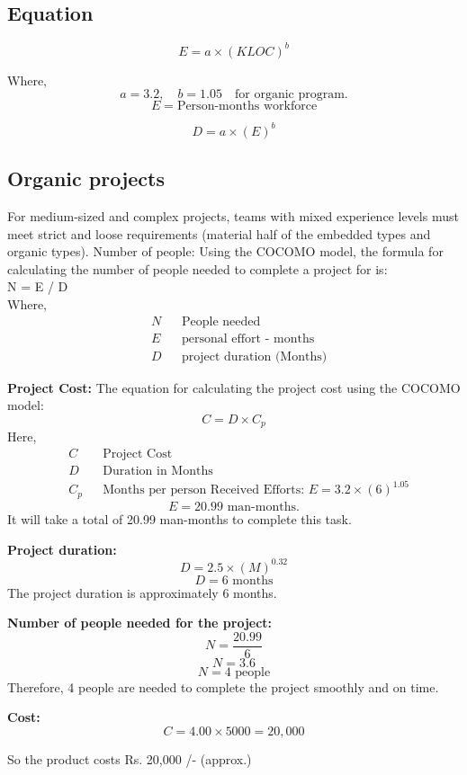 \documentclass[oneside,a4paper,12pt]{report}
\begin{document}
\subsection{Equation}
\[
E = a \times (KLOC)^b
\]

Where,
\[
a = 3.2, \quad b = 1.05 \quad \text{for organic program.}
\]
\[ E = \text{Person-months workforce} \]

\[
D = a \times (E)^b
\]

\subsection{Organic projects}
For medium-sized and complex projects, teams with mixed experience levels must meet strict and loose requirements (material half of the embedded types and organic types). Number of people: Using the COCOMO model, the formula for calculating the number of people needed to complete a project for is:\\
N = E / D\\
Where,
\begin{align*}
    &N & &\text{People needed}\\
    &E & &\text{personal effort - months}\\ 
    &D & &\text{project duration (Months)}
\end{align*}

\textbf{Project Cost:} The equation for calculating the project cost using the COCOMO model: 
\[ C = D \times C_p \]
Here, 
\begin{align*}
    &C & &\text{Project Cost}\\
    &D & &\text{Duration in Months}\\
    &C_p & &\text{Months per person Received Efforts: } E = 3.2 \times (6)^{1.05}
\end{align*}
\[ E = 20.99 \text{ man-months.} \]
It will take a total of 20.99 man-months to complete this task.

\textbf{Project duration:}
\[ D = 2.5 \times (M)^{0.32} \]
\[ D = 6 \text{ months} \]
The project duration is approximately 6 months.

\textbf{Number of people needed for the project:}
\[ N = \frac{20.99}{6} \]
\[ N = 3.6 \]
\[ N = 4 \text{ people} \]
Therefore, 4 people are needed to complete the project smoothly and on time.

\textbf{Cost:}
\[ C = 4.00 \times 5000 = 20,000 \]

So the product costs Rs. 20,000 /- (approx.)
\end{document}
